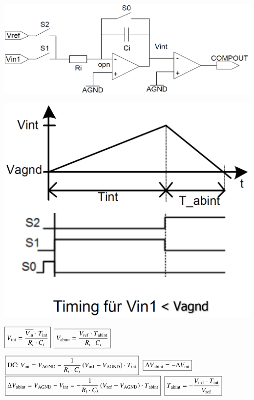 \begin{minipage}{0.42\linewidth}
    \includegraphics[width=\linewidth]{images/dual_slope_ADC}
\end{minipage}
\hfill
\begin{minipage}{0.27\linewidth}
    \includegraphics[width=0.83\linewidth]{images//dual_slope_ADC_timing}
\end{minipage}
    \hfill
\begin{minipage}{0.29\linewidth}
    $ \boxed{  V_{\rm int} = \frac{\overline{V_{\rm in}} \cdot T_{\rm int}}{R_i \cdot C_i} } $ 
    $ \boxed{  V_{\rm abint} = \frac{V_{\rm ref} \cdot T_{\rm abint}}{R_i \cdot C_i}  } $ 
\end{minipage}
    
$ \boxed{ \text{DC: } V_{\rm int} = V_{\rm AGND}- \frac{1}{R_i \cdot C_i} \, (V_{\rm in1}- V_{\rm AGND}) \cdot T_{\rm int} } $ 
\quad $\boxed{ \Delta V_{\rm abint} = - \Delta V_{\rm int} }$ \\
$ \boxed{ \Delta V_{\rm abint} = V_{\rm AGND} - V_{\rm int} = - \frac{1}{R_i \cdot C_i} \, (V_{\rm ref} - V_{\rm AGND}) \cdot T_{\rm abint} }$ 
\quad $\boxed{ T_{\rm abint} = - \frac{V_{\rm in1} \cdot T_{\rm int}}{V_{\rm ref}} }$\\
  
